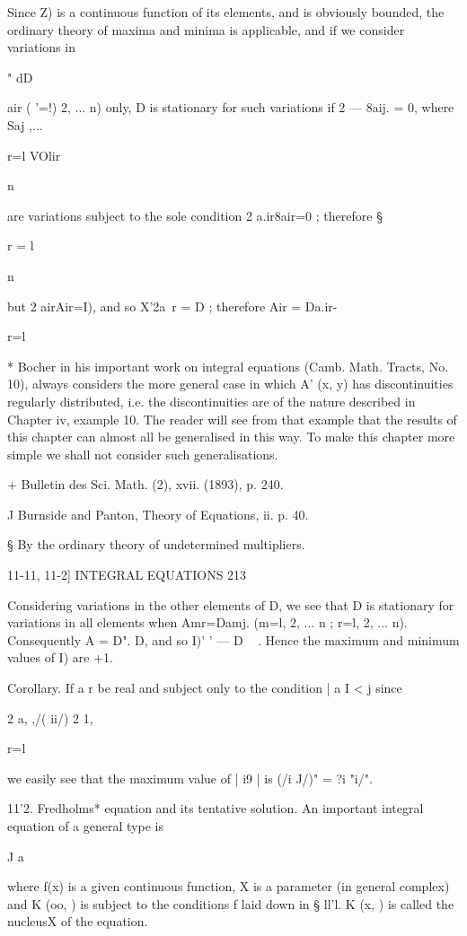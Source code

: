 Since Z) is a continuous function of its elements, and is obviously
bounded, the ordinary theory of maxima and minima is applicable, and
if we consider variations in

" dD

air ( '=!) 2, ... n) only, D is stationary for such variations if 2 —
8aij. = 0, where Saj ,...

r=l VOlir

n

are variations subject to the sole condition 2 a.ir8air=0 ; therefore
§

r = l

n

but 2 airAir=I), and so X'2a\ r = D ; therefore Air = Da.ir-

r=l

* Bocher in his important work on integral equations (Camb. Math.
Tracts, No. 10), always considers the more general case in which A'
(x, y) has discontinuities regularly distributed, i.e. the
discontinuities are of the nature described in Chapter iv, example 10.
The reader will see from that example that the results of this chapter
can almost all be generalised in this way. To make this chapter more
simple we shall not consider such generalisations.

+ Bulletin des Sci. Math. (2), xvii. (1893), p. 240.

J Burnside and Panton, Theory of Equations, ii. p. 40.

§ By the ordinary theory of undetermined multipliers.



11-11, 11-2] INTEGRAL EQUATIONS 213

Considering variations in the other elements of D, we see that D is
stationary for variations in all elements when Amr=Damj. (m=l, 2, ...
n ; r=l, 2, ... n). Consequently A = D". D, and so I)' ' — D ~ . Hence
the maximum and minimum values of I) are +1.

Corollary. If a r be real and subject only to the condition | a I < j
since

2 a, ,/( ii/) 2 1,

r=l

we easily see that the maximum value of | i9 | is (/i J/)" = ?i "i/".

11'2. Fredholms* equation and its tentative solution. An important
integral equation of a general type is

J a

where f(x) is a given continuous function, X is a parameter (in
general complex) and K (oo, ) is subject to the conditions f laid down
in § ll'l. K (x, ) is called the nucleusX of the equation.

